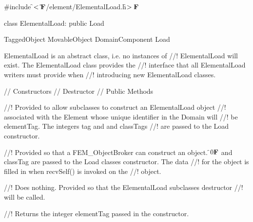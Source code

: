 
\indent \#include \f$<\tilde{ }{\bf F}$/element/ElementalLoad.h\f$>{\bf F}$

\indent class ElementalLoad: public Load

\indent TaggedObject
\indent MovableObject
\indent\indent DomainComponent
\indent\indent\indent Load
\indent\indent\indent{}

\indent ElementalLoad is an abstract class, i.e. no instances of
//! ElementalLoad will exist. The ElementalLoad class provides the
//! interface that all ElementalLoad writers must provide when
//! introducing new ElementalLoad classes. 

\indent\indent // Constructors
\indent{} 
\indent{}
\indent\indent // Destructor
\indent{}
\indent\indent // Public Methods
\indent{}



//! Provided to allow subclasses to construct an ElementalLoad object
//! associated with the Element whose unique identifier in the Domain will
//! be \p elementTag. The integers \p tag and and \p classTags
//! are passed to the Load constructor. 

//! Provided so that a FEM\_ObjectBroker can construct an object. \f$0{\bf F}$ and
\p classTag are passed to the Load classes constructor. The data
//! for the object is filled in when recvSelf() is invoked on the
//! object.

//! Does nothing. Provided so that the ElementalLoad subclasses destructor
//! will be called.

\indent{}
//! Returns the integer \p elementTag passed in the constructor. 
